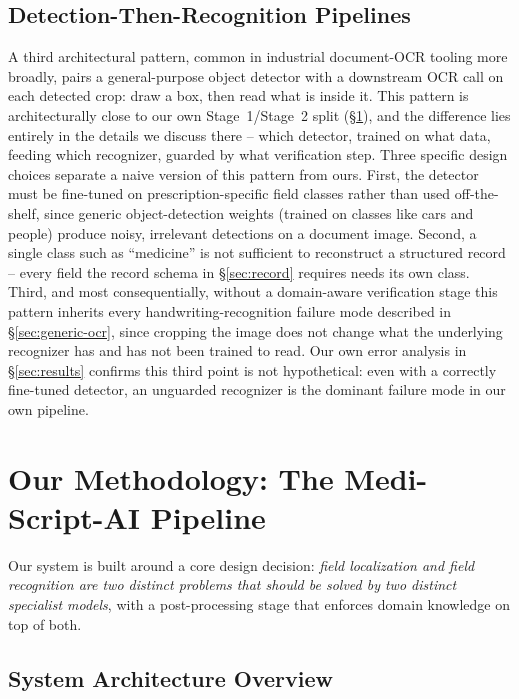 \documentclass[conference]{IEEEtran}
\begin{document}
\subsection{Detection-Then-Recognition Pipelines}
\label{sec:detection-recognition}

A third architectural pattern, common in industrial document-OCR tooling more broadly, pairs a general-purpose object detector with a downstream OCR call on each detected crop: draw a box, then read what is inside it. This pattern is architecturally close to our own Stage~1/Stage~2 split (\S\ref{sec:methodology}), and the difference lies entirely in the details we discuss there -- which detector, trained on what data, feeding which recognizer, guarded by what verification step. Three specific design choices separate a naive version of this pattern from ours. First, the detector must be fine-tuned on prescription-specific field classes rather than used off-the-shelf, since generic object-detection weights (trained on classes like cars and people) produce noisy, irrelevant detections on a document image. Second, a single class such as ``medicine'' is not sufficient to reconstruct a structured record -- every field the record schema in \S\ref{sec:record} requires needs its own class. Third, and most consequentially, without a domain-aware verification stage this pattern inherits every handwriting-recognition failure mode described in \S\ref{sec:generic-ocr}, since cropping the image does not change what the underlying recognizer has and has not been trained to read. Our own error analysis in \S\ref{sec:results} confirms this third point is not hypothetical: even with a correctly fine-tuned detector, an unguarded recognizer is the dominant failure mode in our own pipeline.

\section{Our Methodology: The Medi-Script-AI Pipeline}
\label{sec:methodology}

Our system is built around a core design decision: \emph{field localization and field recognition are two distinct problems that should be solved by two distinct specialist models}, with a post-processing stage that enforces domain knowledge on top of both.

\subsection{System Architecture Overview}
\end{document}
